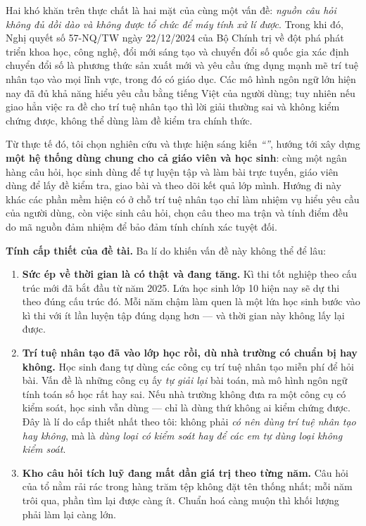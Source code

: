 Hai khó khăn trên thực chất là hai mặt của cùng một vấn đề: \textit{nguồn câu
hỏi không đủ dồi dào và không được tổ chức để máy tính xử lí được}. Trong khi
đó, Nghị quyết số 57-NQ/TW ngày 22/12/2024 của Bộ Chính trị về đột phá phát
triển khoa học, công nghệ, đổi mới sáng tạo và chuyển đổi số quốc gia xác định
chuyển đổi số là phương thức sản xuất mới và yêu cầu ứng dụng mạnh mẽ trí tuệ
nhân tạo vào mọi lĩnh vực, trong đó có giáo dục. Các mô hình ngôn ngữ lớn hiện
nay đã đủ khả năng hiểu yêu cầu bằng tiếng Việt của người dùng; tuy nhiên nếu
giao hẳn việc ra đề cho trí tuệ nhân tạo thì lời giải thường sai và không kiểm
chứng được, không thể dùng làm đề kiểm tra chính thức.

Từ thực tế đó, tôi chọn nghiên cứu và thực hiện sáng kiến
\textit{``\TENSANGKIEN''}, hướng tới xây dựng \textbf{một hệ thống dùng chung
cho cả giáo viên và học sinh}: cùng một ngân hàng câu hỏi, học sinh dùng để tự
luyện tập và làm bài trực tuyến, giáo viên dùng để lấy đề kiểm tra, giao bài và
theo dõi kết quả lớp mình. Hướng đi này khác các phần mềm hiện có ở chỗ trí tuệ
nhân tạo chỉ làm nhiệm vụ hiểu yêu cầu của người dùng, còn việc sinh câu hỏi,
chọn câu theo ma trận và tính điểm đều do mã nguồn đảm nhiệm để bảo đảm tính
chính xác tuyệt đối.


\textbf{Tính cấp thiết của đề tài.} Ba lí do khiến vấn đề này không thể để lâu:

\begin{enumerate}[label=(\arabic*), leftmargin=1.2cm, itemsep=4pt]
  \item \textbf{Sức ép về thời gian là có thật và đang tăng.} Kì thi tốt nghiệp
        theo cấu trúc mới đã bắt đầu từ năm 2025. Lứa học sinh lớp 10 hiện nay
        sẽ dự thi theo đúng cấu trúc đó. Mỗi năm chậm làm quen là một lứa học
        sinh bước vào kì thi với ít lần luyện tập đúng dạng hơn --- và thời
        gian này không lấy lại được.
  \item \textbf{Trí tuệ nhân tạo đã vào lớp học rồi, dù nhà trường có chuẩn bị
        hay không.} Học sinh đang tự dùng các công cụ trí tuệ nhân tạo miễn phí
        để hỏi bài. Vấn đề là những công cụ ấy \textit{tự giải lại} bài toán,
        mà mô hình ngôn ngữ tính toán số học rất hay sai. Nếu nhà trường không
        đưa ra một công cụ có kiểm soát, học sinh vẫn dùng --- chỉ là dùng thứ
        không ai kiểm chứng được. Đây là lí do cấp thiết nhất theo tôi: không
        phải \textit{có nên dùng trí tuệ nhân tạo hay không}, mà là
        \textit{dùng loại có kiểm soát hay để các em tự dùng loại không kiểm
        soát}.
  \item \textbf{Kho câu hỏi tích luỹ đang mất dần giá trị theo từng năm.} Câu
        hỏi của tổ nằm rải rác trong hàng trăm tệp không đặt tên thống nhất;
        mỗi năm trôi qua, phần tìm lại được càng ít. Chuẩn hoá càng muộn thì
        khối lượng phải làm lại càng lớn.
\end{enumerate}

